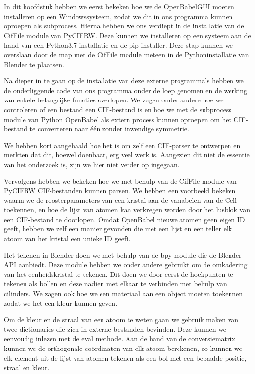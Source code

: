 In dit hoofdstuk hebben we eerst bekeken hoe we de OpenBabelGUI moeten installeren op een Windowssysteem, zodat we dit in ons programma kunnen oproepen als subprocess. Hierna hebben we ons verdiept in de installatie van de CifFile module van PyCIFRW. Deze kunnen we installeren op een systeem aan de hand van een Python3.7 installatie en de pip installer. Deze stap kunnen we overslaan door de map met de CifFile module meteen in de Pythoninstallatie van Blender te plaatsen.
\par
Na dieper in te gaan op de installatie van deze externe programma's hebben we de onderliggende code van ons programma onder de loep genomen en de werking van enkele belangrijke functies overlopen. We zagen onder andere hoe we controleren of een bestand een CIF-bestand is en hoe we met de subprocess module van Python OpenBabel als extern process kunnen oproepen om het CIF-bestand te converteren naar één zonder inwendige symmetrie. 
\par
We hebben kort aangehaald hoe het is om zelf een CIF-parser te ontwerpen en merkten dat dit, hoewel doenbaar, erg veel werk is. Aangezien dit niet de essentie van het onderzoek is, zijn we hier niet verder op ingegaan. 
\par 
Vervolgens hebben we bekeken hoe we met behulp van de CifFile module van PyCIFRW CIF-bestanden kunnen parsen. We hebben een voorbeeld bekeken waarin we de roosterparameters van een kristal aan de variabelen van de Cell toekennen, en hoe de lijst van atomen kan verkregen worden door het lusblok van een CIF-bestand te doorlopen. Omdat OpenBabel nieuwe atomen geen eigen ID geeft, hebben we zelf een manier gevonden die met een lijst en een teller elk atoom van het kristal een unieke ID geeft.
\par 
Het tekenen in Blender doen we met behulp van de bpy module die de Blender API aanbiedt. Deze module hebben we onder andere gebruikt om de omkadering van het eenheidskristal te tekenen. Dit doen we door eerst de hoekpunten te tekenen als bollen en deze nadien met elkaar te verbinden met behulp van cilinders. We zagen ook hoe we een materiaal aan een object moeten toekennen zodat we het een kleur kunnen geven.
\par
Om de kleur en de straal van een atoom te weten gaan we gebruik maken van twee dictionaries die zich in externe bestanden bevinden. Deze kunnen we eenvoudig inlezen met de eval methode. Aan de hand van de conversiematrix kunnen we de orthogonale coördinaten van elk atoom berekenen, zo kunnen we elk element uit de lijst van atomen tekenen als een bol met een bepaalde positie, straal en kleur.
